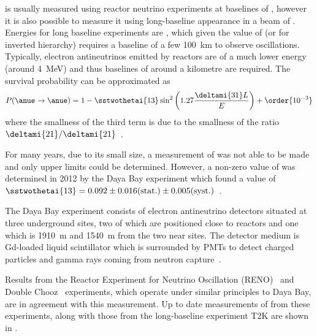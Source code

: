  is usually measured using reactor neutrino experiments at baselines of , however it is also possible to measure it using long-baseline \nue appearance in a beam of \numu.
Energies for long baseline experiments are , which given the value of  (or  for inverted hierarchy) requires a baseline of a few \SI{100}{\kilo\metre} to observe oscillations.
Typically, electron antineutrinos emitted by reactors are of a much lower energy (around \SI{4}{\mega\electronvolt}) and thus baselines of around a kilometre are required.
The \anue survival probability can be approximated as 
\begin{equation}
  P(\anue \rightarrow \anue) = 1 - \sstwothetai{13}\sin^{2}\left( 1.27 \frac{\deltami{31}L}{E} \right) + \order{10^{-3}}
\end{equation}
where the smallness of the third term is due to the smallness of the ratio $\deltami{21}/\deltami{21}$~\cite{kuze2013measurements}.

For many years, due to its small size, a measurement of  was not able to be made and only upper limits could be determined.
However, a non-zero value of  was determined in 2012 by the Daya Bay experiment which found a value of $\sstwothetai{13} = 0.092\pm0.016(\text{stat.})\pm0.005(\text{syst.})$~\cite{dayaBay}.

The Daya Bay experiment consists of electron antineutrino detectors situated at three underground sites, two of which are positioned close to reactors and one which is \SI{1910}{\metre} and \SI{1540}{\metre} from the two near sites.
The detector medium is Gd-loaded liquid scintillator which is surrounded by PMTs to detect charged particles and gamma rays coming from neutron capture~\cite{dayaBayDetector}.

Results from the Reactor Experiment for Neutrino Oscillation (RENO)~\cite{reno} and Double Chooz~\cite{doubleChooz} experiments, which operate under similar principles to Daya Bay, are in agreement with this measurement.
Up to date measurements of  from these experiments, along with those from the long-baseline experiment T2K are shown in .

